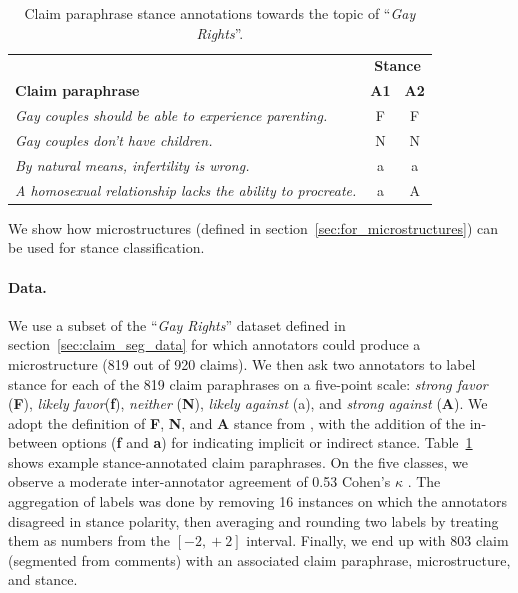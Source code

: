 \begin{table}[t]
\begin{center}
{%
\begin{tabular}{p{}c c}
\toprule
& \multicolumn{2}{c}{\textbf{Stance}}\\
\cmidrule(lr){2-3}
\textbf{\textbf{Claim paraphrase}} & \textbf{A1} & \textbf{A2} \\
\midrule
\emph{Gay couples should be able to experience parenting.} & F & F \\
\midrule
\emph{Gay couples don't have children.} & N & N \\
\midrule
\emph{By natural means, infertility is wrong.} & a & a \\
\midrule
\emph{A homosexual relationship lacks the ability to procreate.} & a & A  \\
\bottomrule
\end{tabular}}
\caption{Claim paraphrase 
	stance annotations towards the topic of ``\emph{Gay Rights}''.}
\label{tab:microstructure_stance}
\end{center}
\end{table}

We show how microstructures (defined in section~\ref{sec:for_microstructures})
can be used for stance classification. 

\paragraph{Data.} We use a subset  of the ``\emph{Gay Rights}'' dataset defined in
section~\ref{sec:claim_seg_data} for which annotators could produce 
a microstructure (819 out of 920 claims). We then ask two annotators to label
stance for each of the 819 claim paraphrases on a five-point scale:
\emph{strong favor} (\textbf{F}), \emph{likely favor}(\textbf{f}), \emph{neither} (\textbf{N}),
\emph{likely against} (a), and \emph{strong against} (\textbf{A}). 
We adopt the definition of \textbf{F}, \textbf{N}, and \textbf{A} stance from 
\citep{mohammad2016semeval}, with the addition of the in-between options
(\textbf{f} and \textbf{a}) for indicating implicit or indirect stance. 
Table~\ref{tab:microstructure_stance} shows example stance-annotated  
claim paraphrases. On the five classes, we observe a moderate inter-annotator
agreement of 0.53 Cohen's $\kappa$ \citep{cohen1960coefficient}.
The aggregation of labels was done by removing 16 instances on which the
annotators disagreed in stance polarity, then averaging and rounding two labels
by treating them as numbers from the $[-2, \mathop{+}2]$ interval.
Finally, we end up with 803 claim (segmented from comments) with an 
associated claim paraphrase, microstructure, and stance. 

